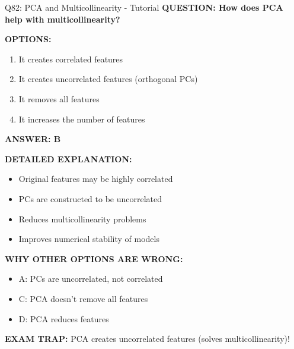 \documentclass[8pt]{beamer}
\begin{document}
	\begin{frame}{Q82: PCA and Multicollinearity - Tutorial}
		\fontsize{6.5}{7.5}\selectfont
		\textbf{QUESTION: How does PCA help with multicollinearity?}
		
		\vspace{0.1cm}
		\textbf{OPTIONS:}
		\begin{enumerate}
			\item It creates correlated features
			\item It creates uncorrelated features (orthogonal PCs)
			\item It removes all features
			\item It increases the number of features
		\end{enumerate}
		
		\vspace{0.1cm}
		\textcolor{myblue}{\textbf{ANSWER: B}}
		
		\vspace{0.1cm}
		\textbf{DETAILED EXPLANATION:}
		\begin{itemize}
			\item Original features may be highly correlated
			\item PCs are constructed to be uncorrelated
			\item Reduces multicollinearity problems
			\item Improves numerical stability of models
		\end{itemize}
		
		\vspace{0.1cm}
		\textcolor{myred}{\textbf{WHY OTHER OPTIONS ARE WRONG:}}
		\begin{itemize}
			\item \textcolor{myred}{A:} PCs are uncorrelated, not correlated
			\item \textcolor{myred}{C:} PCA doesn't remove all features
			\item \textcolor{myred}{D:} PCA reduces features
		\end{itemize}
		
		\textcolor{myred}{\textbf{EXAM TRAP:}} PCA creates \textcolor{myblue}{uncorrelated features} (solves multicollinearity)!
	\end{frame}
	
\end{document}
